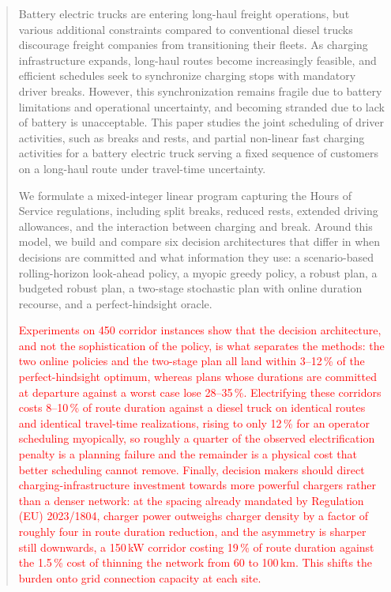 \documentclass[preprint,12pt,3p]{elsarticle}
\newcommand{\red}[1]{\textcolor{red}{#1}}
\begin{document}
\begin{frontmatter}

\begin{abstract}
Battery electric trucks are entering long-haul freight operations, but various additional constraints compared to conventional diesel trucks discourage freight companies from transitioning their fleets.
As charging infrastructure expands, long-haul routes become increasingly feasible, and efficient schedules seek to synchronize charging stops with mandatory driver breaks. However, this synchronization remains fragile due to battery limitations and operational uncertainty, and becoming stranded due to lack of battery is unacceptable.
This paper studies the joint scheduling of driver activities, such as breaks and rests, and partial non-linear fast charging activities for a battery electric truck serving a fixed sequence of customers on a long-haul route under travel-time uncertainty.

We formulate a mixed-integer linear program capturing the Hours of Service regulations, including split breaks, reduced rests, extended driving allowances, and the interaction between charging and break. Around this model, we build and compare six decision architectures that differ in when decisions are committed and what information they use: a scenario-based rolling-horizon look-ahead policy, a myopic greedy policy, a robust plan, a budgeted robust plan, a two-stage stochastic plan with online duration recourse, and a perfect-hindsight oracle.

\red{Experiments on 450 corridor instances show that the decision architecture, and not the sophistication of the policy, is what separates the methods: the two online policies and the two-stage plan all land within 3--12\,\% of the perfect-hindsight optimum, whereas plans whose durations are committed at departure against a worst case lose 28--35\,\%.}
\red{Electrifying these corridors costs 8--10\,\% of route duration against a diesel truck on identical routes and identical travel-time realizations, rising to only 12\,\% for an operator scheduling myopically, so roughly a quarter of the observed electrification penalty is a planning failure and the remainder is a physical cost that better scheduling cannot remove.}
\red{Finally, decision makers should direct charging-infrastructure investment towards more powerful chargers rather than a denser network: at the spacing already mandated by Regulation (EU) 2023/1804, charger power outweighs charger density by a factor of roughly four in route duration reduction, and the asymmetry is sharper still downwards, a 150\,kW corridor costing 19\,\% of route duration against the 1.5\,\% cost of thinning the network from 60 to 100\,km. This shifts the burden onto grid connection capacity at each site.}


\end{abstract}
\end{frontmatter}
\end{document}
